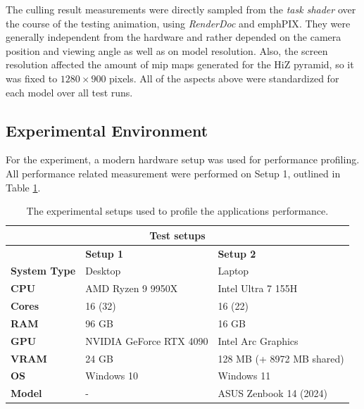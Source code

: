 \noindent
The culling result measurements were directly sampled from the \emph{task shader} over the course of the testing 
animation, using \emph{RenderDoc} and emph{PIX}. They were generally independent from the hardware and rather 
depended on the camera position and viewing angle as well as on model resolution. Also, the screen resolution 
affected the amount of mip maps generated for the \ac{HiZ} pyramid, so it was fixed to $1280 \times 900$ pixels. 
All of the aspects above were standardized for each model over all test runs.


\subsection*{Experimental Environment} \label{subsec-experimental-environment}

For the experiment, a modern hardware setup was used for performance profiling. All performance related 
measurement were performed on Setup 1, outlined in Table \ref{tbl:hardware-setup}.

\begin{table}[h]          %
  \centering
    \begin{tabular}{|lll|}
        \hline
        \multicolumn{3}{|c|}{\textbf{Test setups}}                                                                              \\ \hline
        \multicolumn{1}{|l|}{}                     & \multicolumn{1}{l|}{\textbf{Setup 1}}          & \textbf{Setup 2}          \\ \hline
        \multicolumn{1}{|l|}{\textbf{System Type}} & \multicolumn{1}{l|}{Desktop}                   & Laptop                    \\
        \multicolumn{1}{|l|}{\textbf{CPU}}         & \multicolumn{1}{l|}{AMD Ryzen 9 9950X}         & Intel Ultra 7 155H        \\
        \multicolumn{1}{|l|}{\textbf{Cores}}       & \multicolumn{1}{l|}{16 (32)}                   & 16 (22)                   \\
        \multicolumn{1}{|l|}{\textbf{RAM}}         & \multicolumn{1}{l|}{96 GB}                     & 16 GB                     \\
        \multicolumn{1}{|l|}{\textbf{GPU}}         & \multicolumn{1}{l|}{NVIDIA GeForce RTX 4090}   & Intel Arc Graphics        \\
        \multicolumn{1}{|l|}{\textbf{VRAM}}        & \multicolumn{1}{l|}{24 GB}                     & 128 MB (+ 8972 MB shared) \\
        \multicolumn{1}{|l|}{\textbf{OS}}          & \multicolumn{1}{l|}{Windows 10}                & Windows 11                \\
        \multicolumn{1}{|l|}{\textbf{Model}}       & \multicolumn{1}{l|}{-}                         & ASUS Zenbook 14 (2024)    \\ \hline
    \end{tabular}
    \caption{The experimental setups used to profile the applications performance.}
    \label{tbl:hardware-setup}
\end{table}

